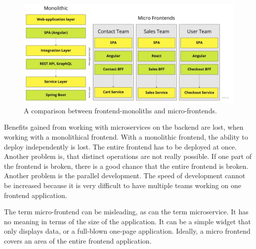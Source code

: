 \documentclass[MSE,Master,english]{twbook}%
\begin{document}
\ifshowImages
\begin{figure}[H]
\centering
\includegraphics[width=0.8\linewidth]{images/ui-monotlith-micro-frontends.jpg}
\caption{A comparison between frontend-monoliths and micro-frontends.}\label{figure:state-of-the-art:ui-monotlith-micro-frontend}
\end{figure}
\fi


Benefits gained from working with microservices on the backend are lost, when working with a monolithical frontend. With a monolithic frontend, the ability to deploy independently is lost. The entire frontend has to be deployed at once. Another problem is, that distinct operations are not really possible. If one part of the frontend is broken, there is a good chance that the entire frontend is broken. Another problem is the parallel development. The speed of development cannot be increased because it is very difficult to have multiple teams working on one frontend application. \cite{misc:2019:leitner:micro-frontends}

The term micro-frontend can be misleading, as can the term microservice. It has no meaning in terms of the size of the application. It can be a simple widget that only displays data, or a full-blown one-page application. Ideally, a micro frontend covers an area of the entire frontend application.

\ifshowUnusedContent


\end{document}

